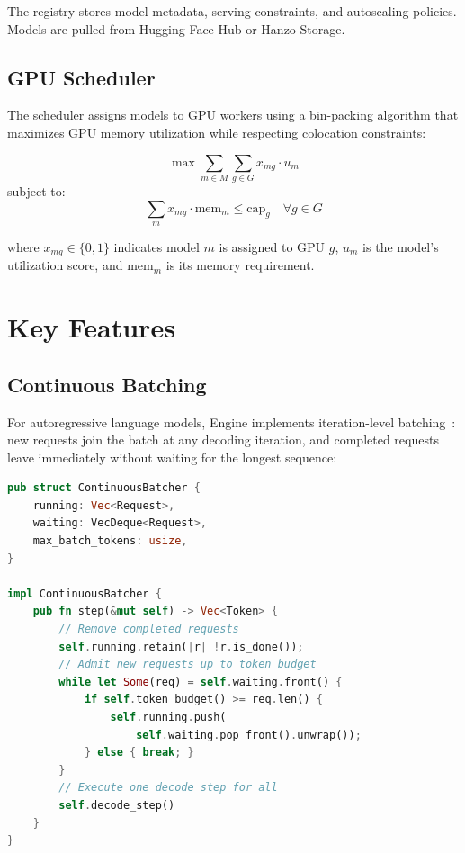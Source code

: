 \documentclass[11pt,twocolumn]{article}
\begin{document}
The registry stores model metadata, serving constraints, and autoscaling policies. Models are pulled from Hugging Face Hub or Hanzo Storage.

\subsection{GPU Scheduler}

The scheduler assigns models to GPU workers using a bin-packing algorithm that maximizes GPU memory utilization while respecting colocation constraints:

\begin{equation}
    \max \sum_{m \in M} \sum_{g \in G} x_{mg} \cdot u_m
\end{equation}
subject to:
\begin{equation}
    \sum_{m} x_{mg} \cdot \text{mem}_m \leq \text{cap}_g \quad \forall g \in G
\end{equation}

where $x_{mg} \in \{0,1\}$ indicates model $m$ is assigned to GPU $g$, $u_m$ is the model's utilization score, and $\text{mem}_m$ is its memory requirement.

\section{Key Features}

\subsection{Continuous Batching}

For autoregressive language models, Engine implements iteration-level batching~\cite{yu2022}: new requests join the batch at any decoding iteration, and completed requests leave immediately without waiting for the longest sequence:

\begin{lstlisting}[language=Rust]
pub struct ContinuousBatcher {
    running: Vec<Request>,
    waiting: VecDeque<Request>,
    max_batch_tokens: usize,
}

impl ContinuousBatcher {
    pub fn step(&mut self) -> Vec<Token> {
        // Remove completed requests
        self.running.retain(|r| !r.is_done());
        // Admit new requests up to token budget
        while let Some(req) = self.waiting.front() {
            if self.token_budget() >= req.len() {
                self.running.push(
                    self.waiting.pop_front().unwrap());
            } else { break; }
        }
        // Execute one decode step for all
        self.decode_step()
    }
}
\end{lstlisting}
\end{document}

